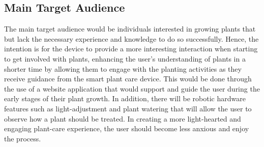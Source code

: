 \documentclass{article}
\begin{document}
    
    

\subsection{Main Target Audience}
The main target audience would be individuals interested in growing plants that but lack the necessary experience and knowledge to do so successfully. Hence, the intention is for the device to provide a more interesting interaction when starting to get involved with plants, enhancing the user's understanding of plants in a shorter time by allowing them to engage with the planting activities as they receive guidance from the smart plant care device. This would be done through the use of a website application that would support and guide the user during the early stages of their plant growth. In addition, there will be robotic hardware features such as light-adjustment and plant watering that will allow the user to observe how a plant should be treated. In creating a more light-hearted and engaging plant-care experience, the user should become less anxious and enjoy the process.
\end{document}
